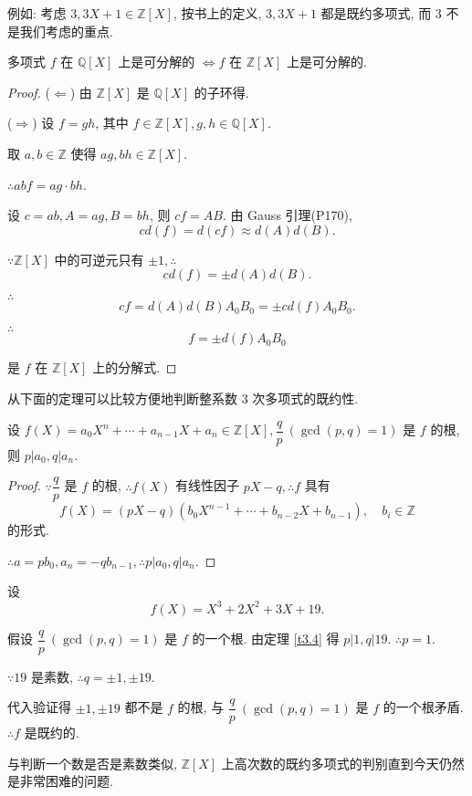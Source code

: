 \documentclass[UTF8]{ctexart}
\begin{document}
例如: 考虑 $3,3X+1\in\mathbb{Z}[X]$, 按书上的定义, $3,3X+1$ 都是既约多项式, 而 $3$ 不是我们考虑的重点.
\begin{theorem}[书上推论的推广]\label{t3.3}
    多项式 $f$ 在 $\mathbb{Q}[X]$ 上是可分解的 $\Leftrightarrow f$ 在 $\mathbb{Z}[X]$ 上是可分解的. 
\end{theorem}
\begin{proof}
    ($\Leftarrow$) 由 $\mathbb{Z}[X]$ 是 $\mathbb{Q}[X]$ 的子环得.

    ($\Rightarrow$) 设 $f=gh$, 其中 $f\in\mathbb{Z}[X],g,h\in\mathbb{Q}[X]$.

    取 $a,b\in\mathbb{Z}$ 使得 $ag,bh\in\mathbb{Z}[X]$.

    $\therefore abf=ag\cdot bh$.

    设 $c=ab,A=ag,B=bh$, 则 $cf=AB$. 由 Gauss 引理(P170),
    \[cd(f)=d(cf)\approx d(A)d(B).\]

    $\because\mathbb{Z}[X]$ 中的可逆元只有 $\pm1,\therefore$
    \[cd(f)=\pm d(A)d(B).\]

    $\therefore$
    \[cf=d(A)d(B)A_0B_0=\pm cd(f)A_0B_0.\]

    $\therefore$
    \[f=\pm d(f)A_0B_0\]

    是 $f$ 在 $\mathbb{Z}[X]$ 上的分解式.
\end{proof}
从下面的定理可以比较方便地判断整系数 $3$ 次多项式的既约性.
\begin{theorem}\label{t3.4}
    设 $f(X)=a_0X^n+\cdots+a_{n-1}X+a_n\in\mathbb{Z}[X],\dfrac{q}{p}\ (\gcd(p,q)=1)$ 是 $f$ 的根, 则 $p|a_0,q|a_n$.
\end{theorem}
\begin{proof}
    $\because\dfrac{q}{p}$ 是 $f$ 的根, $\therefore f(X)$ 有线性因子 $pX-q,\therefore f$ 具有
    \[f(X)=(pX-q)(b_0X^{n-1}+\cdots+b_{n-2}X+b_{n-1}),\quad b_i\in\mathbb{Z}\]
    的形式.

    $\therefore a=pb_0,a_n=-qb_{n-1},\therefore p|a_0,q|a_n$.
\end{proof}
\begin{example}
    设
    \[f(X)=X^3+2X^2+3X+19.\]

    假设 $\dfrac{q}{p}\ (\gcd(p,q)=1)$ 是 $f$ 的一个根. 由定理 \ref{t3.4} 得 $p|1,q|19$. $\therefore p=1$.

    $\because19$ 是素数, $\therefore q=\pm1,\pm19$.

    代入验证得 $\pm1,\pm19$ 都不是 $f$ 的根, 与 $\dfrac{q}{p}\ (\gcd(p,q)=1)$ 是 $f$ 的一个根矛盾. $\therefore f$ 是既约的.
\end{example}
与判断一个数是否是素数类似, $\mathbb{Z}[X]$ 上高次数的既约多项式的判别直到今天仍然是非常困难的问题.
\end{document}
